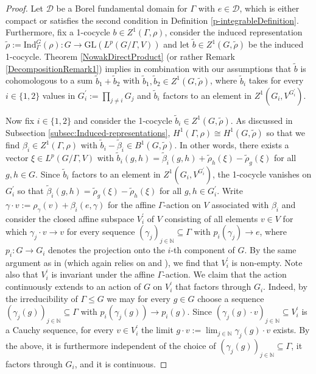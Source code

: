 \documentclass[a4paper,11pt,reqno]{amsart}
\numberwithin{equation}{section}
\theoremstyle{definition}
\theoremstyle{remark}
\theoremstyle{remark}
\begin{document}
\begin{proof} Let $\mathcal{D}$ be a Borel fundamental domain for $\Gamma$ with $e\in\mathcal{D}$, which is either compact or satisfies the second condition in Definition \ref{p-integrableDefinition}. Furthermore, fix a 1-cocycle $b\in Z^{1}(\Gamma,\rho)$, consider the induced representation $\widetilde{\rho}:=\text{Ind}_{\Gamma}^{G}(\rho):G\rightarrow\text{GL}(L^{p}(G/\Gamma,V))$ and let $\widetilde{b}\in Z^{1}(G,\widetilde{\rho})$ be the induced 1-cocycle. Theorem \ref{NowakDirectProduct} (or rather Remark \ref{DecompositionRemark1}) implies in combination with our assumptions that $\widetilde{b}$ is cohomologous to a sum $\widetilde{b}_{1}+\widetilde{b}_{2}$ with $\widetilde{b}_{1},\widetilde{b}_{2}\in Z^{1}(G,\widetilde{\rho})$, where $\widetilde{b}_{i}$ takes for every $i\in\{1,2\}$ values in $G_{i}^{\prime}:=\prod_{j\neq i}G_{j}$ and $\widetilde{b}_{i}$ factors to an element in $Z^{1}(G_{i},V^{G_{i}^{\prime}})$.

Now fix $i\in\{1,2\}$ and consider the 1-cocycle $\widetilde{b}_{i}\in Z^{1}(G,\widetilde{\rho})$. As discussed in Subsection \ref{subsec:Induced-representations}, $H^{1}(\Gamma,\rho)\cong H^{1}(G,\widetilde{\rho})$ so that we find $\beta_{i}\in Z^{1}(\Gamma,\rho)$ with $\widetilde{b}_{i}-\widetilde{\beta}_{i}\in B^{1}(G,\widetilde{\rho})$. In other words, there exists a vector $\xi\in L^{p}(G/\Gamma,V)$ with $\widetilde{b}_{i}(g,h)=\widetilde{\beta}_{i}(g,h)+\widetilde{\rho}_{h}(\xi)-\widetilde{\rho}_{g}(\xi)$ for all $g,h\in G$. Since $\widetilde{b}_{i}$ factors to an element in $Z^{1}(G_{i},V^{G_{i}^{\prime}})$, the 1-cocycle vanishes on $G_{i}^{\prime}$ so that $\widetilde{\beta}_{i}(g,h)=\widetilde{\rho}_{g}(\xi)-\widetilde{\rho}_{h}(\xi)$ for all $g,h\in G_{i}^{\prime}$. Write $\gamma\cdot v:=\rho_{\gamma}(v)+\beta_{i}(e,\gamma)$ for the affine $\Gamma$-action on $V$ associated with $\beta_{i}$ and consider the closed affine subspace $V_{i}^{\prime}$ of $V$ consisting of all elements $v\in V$ for which $\gamma_{j}\cdot v\rightarrow v$ for every sequence $(\gamma_{j})_{j\in\mathbb{N}}\subseteq\Gamma$ with $p_{i}(\gamma_{j})\rightarrow e$, where $p_{i}:G\rightarrow G_{i}$ denotes the projection onto the $i$-th component of $G$. By the same argument as in \cite[Proposition 4.4]{Shalom00} (which again relies on \cite[Theorem 6.3]{Margulis91} and \cite[Lemma 1]{BekkaLouvet97}), we find that $V_{i}^{\prime}$ is non-empty. Note also that $V_{i}^{\prime}$ is invariant under the affine $\Gamma$-action. We claim that the action continuously extends to an action of $G$ on $V_{i}^{\prime}$ that factors through $G_{i}$. Indeed, by the irreducibility of $\Gamma\leq G$ we may for every $g\in G$ choose a sequence $(\gamma_{j}(g))_{j\in\mathbb{N}}\subseteq\Gamma$ with $p_{i}\left(\gamma_{j}(g)\right)\rightarrow p_{i}(g)$. Since $(\gamma_{j}(g)\cdot v)_{j\in\mathbb{N}}\subseteq V_{i}^{\prime}$ is a Cauchy sequence, for every $v\in V_{i}^{\prime}$ the limit $g\cdot v:=\lim_{j\in\mathbb{N}}\gamma_{j}(g)\cdot v$ exists. By the above, it is furthermore independent of the choice of $(\gamma_{j}(g))_{j\in\mathbb{N}}\subseteq\Gamma$, it factors through $G_{i}$, and it is continuous.


\end{proof}
\end{document}
